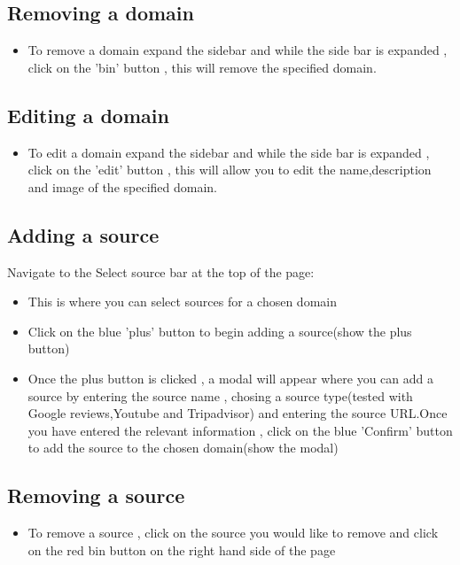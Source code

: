 \documentclass[12pt]{article}
\begin{document}
\subsection{Removing a domain}
\begin{itemize}
    \item To remove a domain expand the sidebar and while the side bar is expanded , click on the 'bin' button , this will remove the specified domain.
\end{itemize}
\subsection{Editing a domain}
\begin{itemize}
    \item To edit a domain expand the sidebar and while the side bar is expanded , click on the 'edit' button , this will allow you to edit the name,description and image of the specified domain.
\end{itemize}
\subsection{Adding a source}
Navigate to the Select source bar at the top of the page:
\begin{itemize}
    \item This is where you can select sources for a chosen domain 
    \item Click on the blue 'plus' button to begin adding a source(show the plus button)
    \item Once the plus button is clicked , a modal will appear where you can add a source by entering the source name , chosing a source type(tested with Google reviews,Youtube and Tripadvisor) and entering the source URL.Once you have entered the relevant information , click on the blue 'Confirm' button to add the source to the chosen domain(show the modal)
\end{itemize}
\subsection{Removing a source}
\begin{itemize}
    \item To remove a source , click on the source you would like to remove and click on the red bin button on the right hand side of the page
\end{itemize}
\newpage
\end{document}
